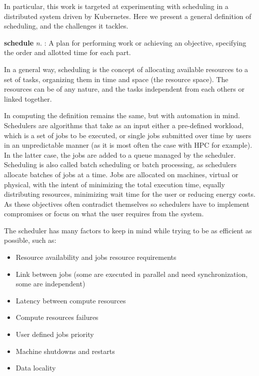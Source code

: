 \documentclass[12pt, a4paper]{memoir}
\begin{document}
In particular, this work is targeted at experimenting with scheduling in a
distributed system driven by Kubernetes. Here we present a general definition
of scheduling, and the challenges it tackles.

\begin{displayquote}[][]
	\textbf{schedule} \textit{n.} : A plan for
	performing work or achieving an objective, specifying the order and
	allotted time for each part.
\end{displayquote}

In a general way, scheduling is the concept of allocating available resources
to a set of tasks, organizing them in time and space (the resource space). The
resources can be of any nature, and the tasks independent from each others or
linked together.

In computing the definition remains the same, but with automation in mind.
Schedulers are algorithms that take as an input either a pre-defined workload,
which is a set of jobs  to be executed, or single jobs submitted over time by
users in an unpredictable manner (as it is most often the case with HPC for
example). In the latter case, the jobs are added to a queue managed by the
scheduler. Scheduling is also called batch scheduling or batch processing, as
schedulers allocate batches of jobs at a time. Jobs are allocated on machines,
virtual or physical, with the intent of minimizing the total execution time,
equally distributing resources, minimizing wait time for the user or reducing
energy costs. As these objectives often contradict themselves so schedulers have
to implement compromises or focus on what the user requires from the system.

The scheduler has many factors to keep in mind while trying to be as efficient
as possible, such as:

\begin{itemize}
	\item Resource availability and jobs resource requirements
	\item Link between jobs (some are executed in parallel and need synchronization, some are independent)
	\item Latency between compute resources
	\item Compute resources failures
	\item User defined jobs priority
	\item Machine shutdowns and restarts
	\item Data locality
\end{itemize}
\end{document}
